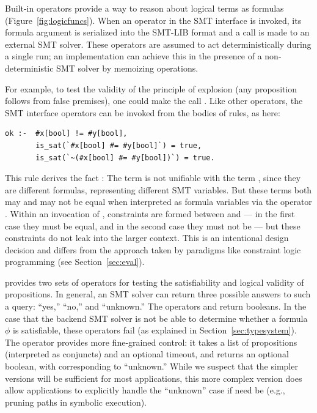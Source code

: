 \documentclass[acmsmall,screen,nonacm]{acmart}
\theoremstyle{definition}
\begin{document}
Built-in operators provide a way to reason about logical terms as formulas
(Figure~\ref{fig:logicfuncs}).
When an operator in the SMT interface is invoked, its formula argument is
serialized into the SMT-LIB format and a call is made to an external SMT
solver.
These operators are assumed to act deterministically during a single \Name run;
an implementation can achieve this in the presence of a non-deterministic SMT
solver by memoizing operations.

For example, to test the validity of the principle of explosion (any
proposition follows from false premises), one could make the call
.
Like other operators, the SMT interface operators can be invoked from the
bodies of rules, as here:
\begin{lstlisting}
ok :-  #x[bool] != #y[bool],
       is_sat(`#x[bool] #= #y[bool]`) = true,
       is_sat(`~(#x[bool] #= #y[bool])`) = true.
\end{lstlisting}
This rule derives the fact : The term  is not unifiable
with the term , since they are different formulas, representing different SMT variables. But these terms both may and may not be equal
when interpreted as formula variables via the operator .
Within an invocation of , constraints are formed between
 and  --- in the first case they must be equal, and
in the second case they must not be --- but these constraints do not leak into
the larger context.
This is an intentional design decision and differs from the approach taken by
paradigms like constraint logic programming (see Section~\ref{sec:eval}).

\Name provides two sets of operators for testing the satisfiability and logical
validity of propositions.
In general, an SMT solver can return three possible answers to such a query:
``yes,'' ``no,'' and ``unknown.''
The operators  and  return booleans.
In the case that the backend SMT solver is not be able to determine whether a
formula $\phi$ is satisfiable, these operators fail (as explained in
Section~\ref{sec:typesystem}).
The operator  provides more fine-grained
control: it takes a list of propositions (interpreted as conjuncts) and an
optional timeout, and returns an optional boolean, with  corresponding
to ``unknown.''
While we suspect that the simpler versions will be sufficient for most
applications, this more complex version does allow applications to explicitly
handle the ``unknown'' case if need be (e.g., pruning paths in symbolic
execution).
\end{document}
